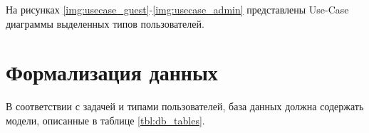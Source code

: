 На рисунках \ref{img:usecase_guest}-\ref{img:usecase_admin} представлены Use-Case диаграммы выделенных типов пользователей.


\clearpage

\section{Формализация данных}

В соответствии с задачей и типами пользователей, база данных должна содержать модели, описанные в таблице \ref{tbl:db_tables}.


